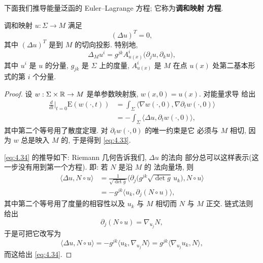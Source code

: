 下面我们推导能量泛函的 Euler--Lagrange 方程; 它称为\textbf{调和映射
方程}.

\begin{lemma}
\label{lem:4.20}
调和映射 $u:\Sigma\to M$ 满足
\begin{equation}
(\Delta u)^T=0,
\label{eq:4.33}
\end{equation}
其中 $(\Delta u)^T$ 是到 $M$ 的切向投影. 特别地,
\begin{equation}
\Delta_Mu^i=g^{jk}A^i_{u(x)}\bigl(\partial_ju,\partial_ku\bigr),
\label{eq:4.34}
\end{equation}
其中 $u^i$ 是 $u$ 的分量, $g_{jk}$ 是 $\Sigma$ 上的度量,
$A^i_{u(x)}$ 是 $M$ 在点 $u(x)$ 处第二基本形式的第 $i$ 个分量.
\end{lemma}

\begin{proof}
设 $w:\Sigma\times\mathbb{R}\to M$ 是单参数映射族, $w(x,0)=u(x)$. 对能量求导
给出
\begin{equation}
\begin{aligned}
\frac{d}{dt}\Big|_{t=0}\mathrm{E}(w(\cdot,t))
&=\int_\Sigma\langle\nabla w(\cdot,0),\nabla\partial_tw(\cdot,0)\rangle\\
&=-\int_\Sigma\langle\Delta u,\partial_tw(\cdot,0)\rangle,
\end{aligned}
\label{eq:4.35}
\end{equation}
其中第二个等号用了散度定理. 对 $\partial_tw(\cdot,0)$ 的唯一约束是它
必须与 $M$ 相切, 因为 $w$ 总是映入 $M$ 的, 于是得到 \eqref{eq:4.33}.

\eqref{eq:4.34} 的推导如下: Riemann 几何告诉我们, $\Delta u$ 的法向
部分总可以这样表示(这一步没有用到第一个方程). 即: 若 $N$ 是沿 $M$ 的
法向量场, 则
\begin{equation}
\begin{aligned}
\langle\Delta u,N\circ u\rangle
&=\frac1{\sqrt{\det g}}\bigl\langle\partial_j
 \bigl(g^{jk}\sqrt{\det g}\,u_k\bigr),N\circ u\bigr\rangle\\
&=-g^{jk}\langle u_k,\partial_j(N\circ u)\rangle,
\end{aligned}
\label{eq:4.36}
\end{equation}
其中第二个等号用了度量的相容性以及 $u_k$ 与 $M$ 相切而 $N$ 与 $M$
正交. 链式法则给出
\begin{equation}
\partial_j(N\circ u)=\nabla_{u_j}N,
\label{eq:4.37}
\end{equation}
于是可把它改写为
\begin{equation}
\langle\Delta u,N\circ u\rangle
 =-g^{jk}\langle u_k,\nabla_{u_j}N\rangle
 =g^{jk}\langle\nabla_{u_j}u_k,N\rangle,
\label{eq:4.38}
\end{equation}
而这给出 \eqref{eq:4.34}.
\end{proof}

